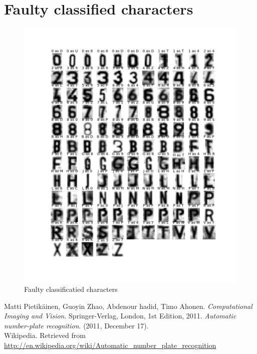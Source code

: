 \documentclass[a4paper]{article}
\begin{document}
\appendix

\section{Faulty classified characters}
\label{fcc}

\begin{figure}[H]
    \hspace{-2cm}
    \includegraphics[scale=0.5]{faulty.png}
    \caption{Faulty classificatied characters}
\end{figure}

\begin{thebibliography}{9}
        Matti Pietik\"ainen, Guoyin Zhao, Abdenour hadid,
        Timo Ahonen.
        \emph{Computational Imaging and Vision}.
        Springer-Verlag, London,
        1st Edition,
        2011.
        \emph{Automatic number-plate recognition}. (2011, December 17). \\
        Wikipedia.
        Retrieved from
        \url{http://en.wikipedia.org/wiki/Automatic_number_plate_recognition}
\end{thebibliography}
\end{document}
